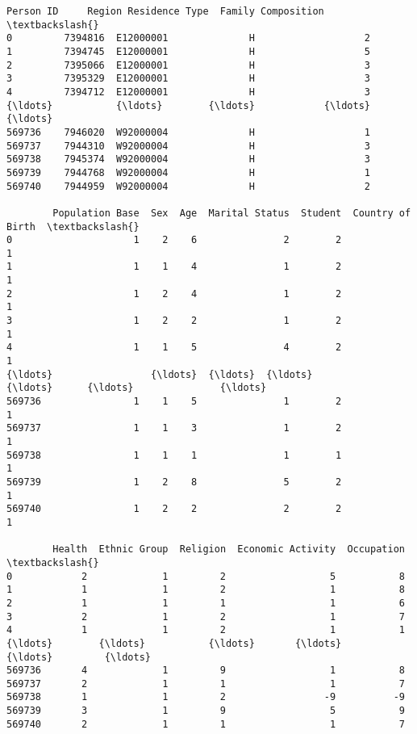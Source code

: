\documentclass[11pt]{article}
\makeatletter
\newcommand{\boxspacing}{\kern\kvtcb@left@rule\kern\kvtcb@boxsep}
\newcommand{\prompt}[4]{
        {\ttfamily\llap{{\color{#2}[#3]:\hspace{3pt}#4}}\vspace{-\baselineskip}}
    }
\makeatother
\begin{document}
            \begin{tcolorbox}[breakable, size=fbox, boxrule=.5pt, pad at break*=1mm, opacityfill=0]
\prompt{Out}{outcolor}{2}{\boxspacing}
\begin{Verbatim}[commandchars=\\\{\}]
        Person ID     Region Residence Type  Family Composition  \textbackslash{}
0         7394816  E12000001              H                   2
1         7394745  E12000001              H                   5
2         7395066  E12000001              H                   3
3         7395329  E12000001              H                   3
4         7394712  E12000001              H                   3
{\ldots}           {\ldots}        {\ldots}            {\ldots}                 {\ldots}
569736    7946020  W92000004              H                   1
569737    7944310  W92000004              H                   3
569738    7945374  W92000004              H                   3
569739    7944768  W92000004              H                   1
569740    7944959  W92000004              H                   2

        Population Base  Sex  Age  Marital Status  Student  Country of Birth  \textbackslash{}
0                     1    2    6               2        2                 1
1                     1    1    4               1        2                 1
2                     1    2    4               1        2                 1
3                     1    2    2               1        2                 1
4                     1    1    5               4        2                 1
{\ldots}                 {\ldots}  {\ldots}  {\ldots}             {\ldots}      {\ldots}               {\ldots}
569736                1    1    5               1        2                 1
569737                1    1    3               1        2                 1
569738                1    1    1               1        1                 1
569739                1    2    8               5        2                 1
569740                1    2    2               2        2                 1

        Health  Ethnic Group  Religion  Economic Activity  Occupation  \textbackslash{}
0            2             1         2                  5           8
1            1             1         2                  1           8
2            1             1         1                  1           6
3            2             1         2                  1           7
4            1             1         2                  1           1
{\ldots}        {\ldots}           {\ldots}       {\ldots}                {\ldots}         {\ldots}
569736       4             1         9                  1           8
569737       2             1         1                  1           7
569738       1             1         2                 -9          -9
569739       3             1         9                  5           9
569740       2             1         1                  1           7


\end{Verbatim}
\end{tcolorbox}
\end{document}
